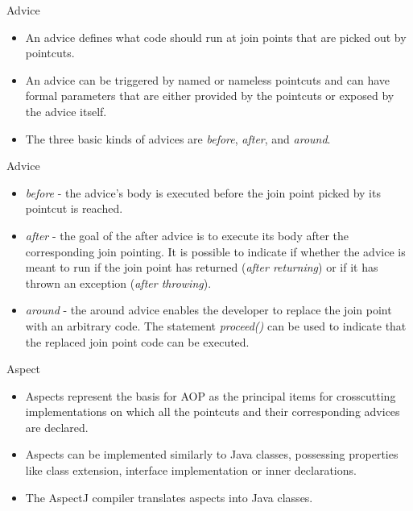 \documentclass[11pt]{beamer}
\begin{document}
\begin{frame}{Advice}
  \begin{itemize}
    \item An advice defines what code should run at join points that are picked out by pointcuts.
    \item An advice can be triggered by named or nameless pointcuts and can have formal parameters that are either provided by the pointcuts or exposed by the advice itself.
    \item The three basic kinds of advices are \emph{before}, \emph{after}, and \emph{around}.
  \end{itemize}
\end{frame}

\begin{frame}{Advice}
  \begin{itemize}
    \item \emph{before} - the advice’s body is executed before the join point picked by its pointcut is reached. 
    \item \emph{after} - the goal of the after advice is to execute its body after the corresponding join pointing. It is possible to indicate if whether the advice is meant to run if the join point has returned (\emph{after returning}) or if it has thrown an exception (\emph{after throwing}).
    \item \emph{around} - the around advice enables the developer to replace the join point with an arbitrary code. The statement \emph{proceed()} can be used to indicate that the replaced join point code can be executed.
  \end{itemize}
\end{frame}

\begin{frame}{Aspect}
  \begin{itemize}
    \item Aspects represent the basis for AOP as the principal items for crosscutting implementations on which all the pointcuts and their corresponding advices are declared.
    \item Aspects can be implemented similarly to Java classes, possessing properties like class extension, interface implementation or inner declarations.
    \item The AspectJ compiler translates aspects into Java classes.
  \end{itemize}
\end{frame}
\end{document}
